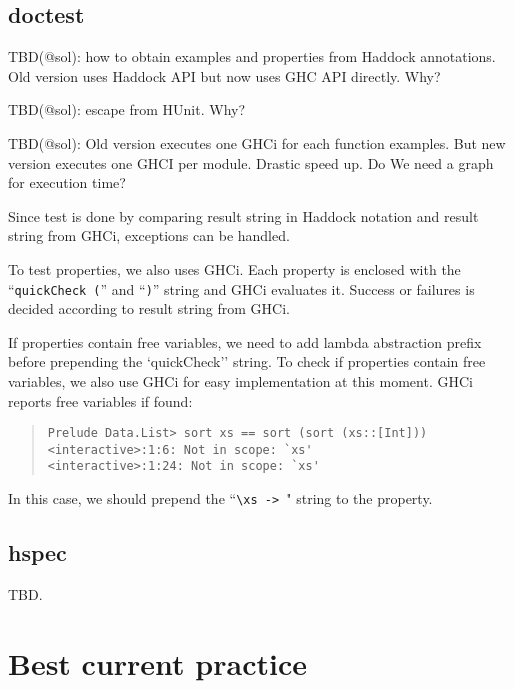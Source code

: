 \documentclass[preprint]{sigplanconf}
\begin{document}
\subsection{doctest}
\label{sec:doctest}

TBD(@sol): how to obtain examples and properties from Haddock annotations.
Old version uses Haddock API but now uses GHC API directly. Why?

TBD(@sol): escape from HUnit. Why?

TBD(@sol): Old version executes one GHCi for each function examples.
But new version executes one GHCI per module.
Drastic speed up. Do We need a graph for execution time?

Since test is done by comparing result string in Haddock notation
and result string from GHCi, exceptions can be handled.

To test properties, we also uses GHCi. 
Each property is enclosed with 
the ``\verb|quickCheck (|'' and ``\verb|)|'' string
and GHCi evaluates it.
Success or failures is decided according to result string from GHCi.

If properties contain free variables,
we need to add lambda abstraction prefix before prepending
the `quickCheck'' string.
To check if properties contain free variables, 
we also use GHCi for easy implementation at this moment.
GHCi reports free variables if found:

\begin{quote}
\small
\begin{verbatim}
Prelude Data.List> sort xs == sort (sort (xs::[Int]))
<interactive>:1:6: Not in scope: `xs'
<interactive>:1:24: Not in scope: `xs'
\end{verbatim}
\end{quote}

\noindent In this case, we should prepend the ``\verb|\xs -> |" string
to the property.

\subsection{hspec}
\label{sec:hspec}

TBD.

\section{Best current practice}
\label{ref:Best-current-practice}
\end{document}
